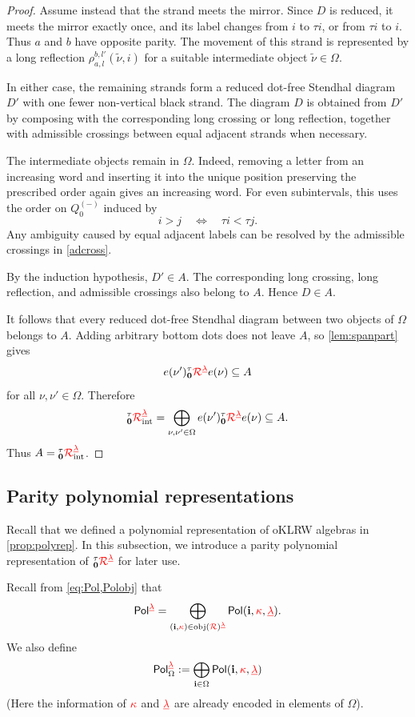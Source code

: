 \begin{proof}
Assume instead that the strand meets the mirror. Since \(D\) is
reduced, it meets the mirror exactly once, and its label changes from
\(i\) to \(\tau i\), or from \(\tau i\) to \(i\). Thus \(a\) and
\(b\) have opposite parity. The movement of this strand is represented
by a long reflection
\(
    \rho_{a,l}^{b,l'}(\widetilde\nu,i)
\)
for a suitable intermediate object \(\widetilde\nu\in\Omega\).

In either case, the remaining strands form a reduced dot-free
Stendhal diagram \(D'\) with one fewer non-vertical black strand.
The diagram \(D\) is obtained from \(D'\) by composing with the
corresponding long crossing or long reflection, together with
admissible crossings between equal adjacent strands when necessary.

The intermediate objects remain in \(\Omega\). Indeed, removing a
letter from an increasing word and inserting it into the unique
position preserving the prescribed order again gives an increasing
word. For even subintervals, this uses the order on \(Q_0^{(-)}\)
induced by
\[
    i>j
    \quad\Longleftrightarrow\quad
    \tau i<\tau j.
\]
Any ambiguity caused by equal adjacent labels can be resolved by the
admissible crossings in \cref{adcross}.

By the induction hypothesis, \(D'\in A\). The corresponding long
crossing, long reflection, and admissible crossings also belong to
\(A\). Hence \(D\in A\).

It follows that every reduced dot-free Stendhal diagram between two
objects of \(\Omega\) belongs to \(A\). Adding arbitrary bottom dots
does not leave \(A\), so \cref{lem:spanpart} gives
\[
    e(\nu'){}^\tau_{{\mathbf{0}}}{{{\color{red}\mathcal{R}}}}^{{{\color{red}\underline{\lambda}}}}e(\nu)
    \subseteq
    A
\]
for all \(\nu,\nu'\in\Omega\). Therefore
\[
    {{}^\tau_{\mathbf{0}}{\color{red}\mathcal{R}}^{{{\color{red}\underline{\lambda}}}}_{\text{int}}}
    =
    \bigoplus_{\nu,\nu'\in\Omega}
    e(\nu'){}^\tau_{{\mathbf{0}}}{{{\color{red}\mathcal{R}}}}^{{{\color{red}\underline{\lambda}}}}e(\nu)
    \subseteq
    A.
\]
Thus \(A={{}^\tau_{\mathbf{0}}{\color{red}\mathcal{R}}^{{{\color{red}\underline{\lambda}}}}_{\text{int}}}\).
\end{proof}

\subsection{Parity polynomial representations}
Recall that we defined a polynomial representation of oKLRW algebras in
\cref{prop:polyrep}. In this subsection, we introduce a parity polynomial
representation of \({}^\tau_{{\mathbf{0}}}{{{\color{red}\mathcal{R}}}}^{{{\color{red}\underline{\lambda}}}}\) for later use.

Recall from \cref{eq:Pol,Polobj} that
\[
\mathsf{Pol}^{{\color{red}\underline{\lambda}}}
=
\bigoplus_{(\mathbf{i},{\color{red}\kappa})\in\operatorname{obj}({{\color{red}\mathcal{R}}})^{{{\color{red}\underline{\lambda}}}}}
\mathsf{Pol}(\mathbf{i},{\color{red}\kappa},{{\color{red}\underline{\lambda}}}).
\]
We also define
\[
{\mathsf{Pol}^{{{\color{red}\underline{\lambda}}}}_{\Omega}}
:=
\bigoplus_{\mathbf{i}\in\Omega}
\mathsf{Pol}(\mathbf{i},{\color{red}\kappa},{{\color{red}\underline{\lambda}}})
\]
(Here the information of ${\color{red}\kappa}$ and ${{\color{red}\underline{\lambda}}}$ are already encoded in elements of $\Omega$).

